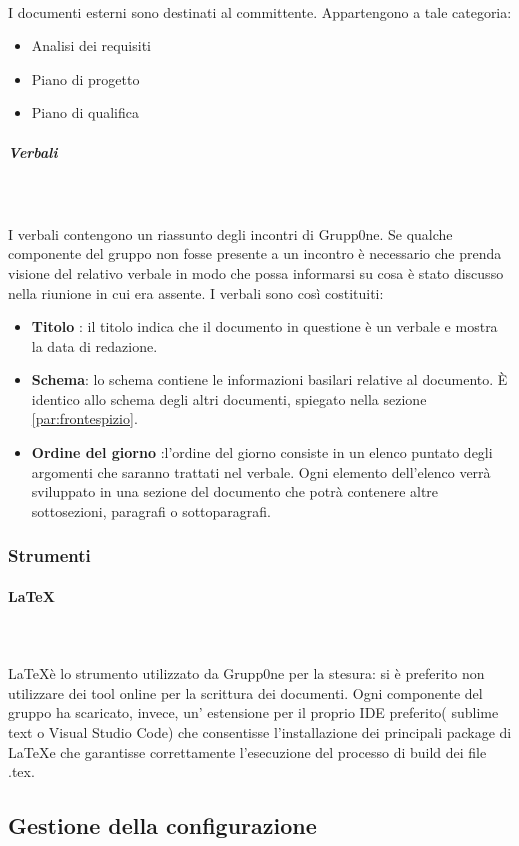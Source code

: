 \documentclass[../norme-di-progetto.tex]{subfiles}
\begin{document}
\\ I documenti esterni sono destinati al committente. Appartengono a tale categoria:
\begin{itemize}
	\item Analisi dei requisiti
	\item Piano di progetto
	\item Piano di qualifica
\end{itemize}
\subparagraph{Verbali}\mbox{}\\
\label{subp:verbali}
\\ I verbali contengono un riassunto degli incontri di Grupp0ne. Se qualche componente del gruppo non fosse presente a un incontro è necessario che prenda visione del relativo verbale in modo che possa informarsi su cosa è stato discusso nella riunione in cui era assente. I verbali sono così costituiti:
\begin{itemize}
	\item \textbf{Titolo} : il titolo indica che il documento in questione è un verbale e mostra la data di redazione.
	\item \textbf{Schema}: lo schema contiene le informazioni basilari relative al documento. È identico allo schema degli altri documenti, spiegato nella sezione \ref{par:frontespizio}.
	\item \textbf{Ordine del giorno} :l'ordine del giorno consiste in un elenco puntato degli argomenti che saranno trattati nel verbale. Ogni elemento dell'elenco verrà sviluppato in una sezione del documento che potrà contenere altre sottosezioni, paragrafi o sottoparagrafi.
\end{itemize}
\subsubsection{Strumenti}
\paragraph {\LaTeX}\mbox{}\\
\label{par:LaTeX}
\\ \LaTeX è lo strumento utilizzato da Grupp0ne per la stesura: si è preferito non utilizzare dei tool online per la scrittura dei documenti. Ogni componente del gruppo ha scaricato, invece, un' estensione per il proprio IDE preferito( sublime text o Visual Studio Code) che consentisse l'installazione dei principali package di \LaTeX e che garantisse correttamente l'esecuzione del processo di build dei file .tex.
\subsection{Gestione della configurazione}
\label{sub:gestione della configurazione}
\end{document}
